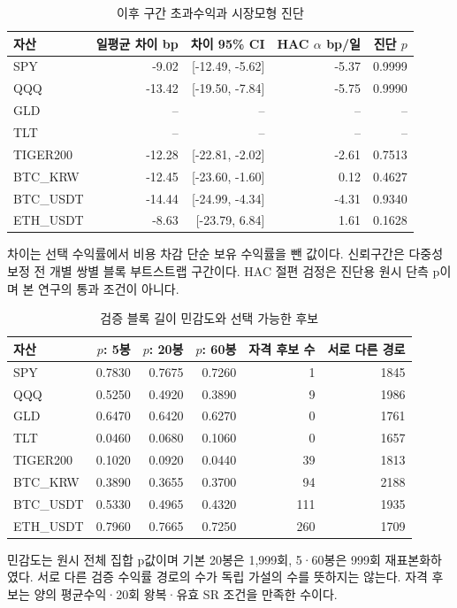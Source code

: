 \documentclass[11pt,a4paper]{article}
\begin{document}
\begin{table}[htbp]\centering
\footnotesize
\setlength{\tabcolsep}{4pt}
\caption{이후 구간 초과수익과 시장모형 진단}
\begin{tabular}{lrrrr}
\toprule
자산 & 일평균 차이 bp & 차이 95\% CI & HAC $\alpha$ bp/일 & 진단 $p$ \\
\midrule
SPY & -9.02 & [-12.49, -5.62] & -5.37 & 0.9999 \\
QQQ & -13.42 & [-19.50, -7.84] & -5.75 & 0.9990 \\
GLD & -- & -- & -- & -- \\
TLT & -- & -- & -- & -- \\
TIGER200 & -12.28 & [-22.81, -2.02] & -2.61 & 0.7513 \\
BTC\_KRW & -12.45 & [-23.60, -1.60] & 0.12 & 0.4627 \\
BTC\_USDT & -14.44 & [-24.99, -4.34] & -4.31 & 0.9340 \\
ETH\_USDT & -8.63 & [-23.79, 6.84] & 1.61 & 0.1628 \\
\bottomrule
\end{tabular}
\par\smallskip\begin{minipage}{\linewidth}\footnotesize 차이는 선택 수익률에서 비용 차감 단순 보유 수익률을 뺀 값이다. 신뢰구간은 다중성 보정 전 개별 쌍별 블록 부트스트랩 구간이다. HAC 절편 검정은 진단용 원시 단측 p이며 본 연구의 통과 조건이 아니다.\end{minipage}
\end{table}
\begin{table}[htbp]\centering
\footnotesize
\setlength{\tabcolsep}{4pt}
\caption{검증 블록 길이 민감도와 선택 가능한 후보}
\begin{tabular}{lrrrrr}
\toprule
자산 & $p$: 5봉 & $p$: 20봉 & $p$: 60봉 & 자격 후보 수 & 서로 다른 경로 \\
\midrule
SPY & 0.7830 & 0.7675 & 0.7260 & 1 & 1845 \\
QQQ & 0.5250 & 0.4920 & 0.3890 & 9 & 1986 \\
GLD & 0.6470 & 0.6420 & 0.6270 & 0 & 1761 \\
TLT & 0.0460 & 0.0680 & 0.1060 & 0 & 1657 \\
TIGER200 & 0.1020 & 0.0920 & 0.0440 & 39 & 1813 \\
BTC\_KRW & 0.3890 & 0.3655 & 0.3700 & 94 & 2188 \\
BTC\_USDT & 0.5330 & 0.4965 & 0.4320 & 111 & 1935 \\
ETH\_USDT & 0.7960 & 0.7665 & 0.7250 & 260 & 1709 \\
\bottomrule
\end{tabular}
\par\smallskip\begin{minipage}{\linewidth}\footnotesize 민감도는 원시 전체 집합 p값이며 기본 20봉은 1,999회, 5·60봉은 999회 재표본화하였다. 서로 다른 검증 수익률 경로의 수가 독립 가설의 수를 뜻하지는 않는다. 자격 후보는 양의 평균수익·20회 왕복·유효 SR 조건을 만족한 수이다.\end{minipage}
\end{table}
\end{document}
